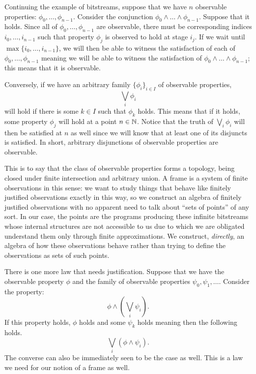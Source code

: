Continuing the example of bitstreams, suppose that we have $n$ observable properties:
$\phi_0, \ldots, \phi_{n-1}$. Consider the conjunction $\phi_0 \wedge \ldots \wedge \phi_{n-1}$. Suppose that it holds.
Since all of $\phi_0, \ldots, \phi_{n-1}$ are observable, there must be corresponding indices $i_0,
\ldots, i_{n-1}$ such that property $\phi_j$ is observed to hold at stage $i_j$. If we wait until
$\max \{ i_0, \ldots, i_{n-1} \}$, we will then be able to witness the satisfaction of each of
$\phi_0, \ldots, \phi_{n-1}$ meaning we will be able to witness the satisfaction of
$\phi_0 \wedge \ldots \wedge \phi_{n-1}$; this means that it is observable.

Conversely, if we have an arbitrary family $\{ \phi_i \}_{i \in I}$ of observable properties,
\begin{equation*}
  \bigvee_i \phi_i
\end{equation*}
will hold if there is some $k \in I$ such that $\phi_k$ holds. This means that if it holds,
some property $\phi_j$ will hold at a point $n \in \mathbb{N}{}$. Notice that the truth of $\bigvee_i \phi_i$
will then be satisfied at $n$ as well since we will know that at least one of its
disjuncts is satisfied. In short, arbitrary disjunctions of observable properties are
observable.

This is to say that the class of observable properties forms a topology, being closed
under finite intersection and arbitrary union. A frame is a system of finite observations
in this sense: we want to study things that behave like finitely justified observations
exactly in this way, so we construct an algebra of finitely justified observations with no
apparent need to talk about ``sets of points'' of any sort. In our case, the points are
the programs producing these infinite bitstreams whose internal structures are not
accessible to us due to which we are obligated understand them only through finite
approximations. We construct, \emph{directly}, an algebra of how these observations behave
rather than trying to define the observations as sets of such points.

There is one more law that needs justification. Suppose that we have the
observable property $\phi$ and the family of observable properties $\psi_0, \psi_1, \ldots$. Consider
the property:
\begin{equation*}
  \phi \wedge (\bigvee_i \psi_i).
\end{equation*}
If this property holds, $\phi$ holds and some $\psi_k$ holds meaning then the following holds.
\begin{equation*}
  \bigvee_i (\phi \wedge \psi_i).
\end{equation*}
The converse can also be immediately seen to be the case as well. This is a law we need
for our notion of a frame as well.

